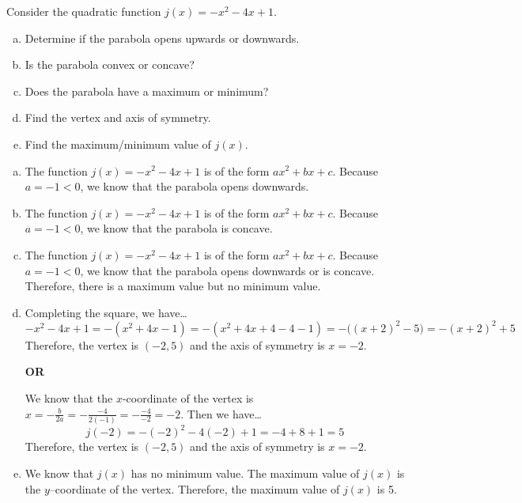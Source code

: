 \documentclass[11pt,letterpaper]{article}
\begin{document}
\newpage



 Consider the quadratic function $j(x)= -x^2 - 4x + 1$.
        \begin{enumerate}[(a)]
        \item Determine if the parabola opens upwards or downwards.
        \item Is the parabola convex or concave?
        \item Does the parabola have a maximum or minimum? 
        \item Find the vertex and axis of symmetry. 
        \item Find the maximum/minimum value of $j(x)$. 
        \end{enumerate} \pspace

\sol
\begin{enumerate}[(a)]
\item The function $j(x)= -x^2 - 4x + 1$ is of the form $ax^2 + bx + c$. Because $a= -1 < 0$, we know that the parabola opens downwards. \pspace

\item The function $j(x)= -x^2 - 4x + 1$ is of the form $ax^2 + bx + c$. Because $a= -1 < 0$, we know that the parabola is concave.\pspace

\item The function $j(x)= -x^2 - 4x + 1$ is of the form $ax^2 + bx + c$. Because $a= -1 < 0$, we know that the parabola opens downwards or is concave. Therefore, there is a maximum value but no minimum value. \pspace

\item Completing the square, we have\dots
	\[
	-x^2 - 4x + 1= -(x^2 + 4x - 1)= -(x^2 + 4x + 4 - 4 - 1)= -\big( (x + 2)^2 - 5 \big)= -(x + 2)^2 + 5
	\]
Therefore, the vertex is $(-2, 5)$ and the axis of symmetry is $x= -2$. 

\begin{center} {\bfseries OR} \end{center}

We know that the $x$-coordinate of the vertex is $x= -\frac{b}{2a}= -\frac{-4}{2(-1)}= -\frac{-4}{-2}= -2$. Then we have\dots
	\[
	j(-2)= -(-2)^2 - 4(-2) + 1= -4 + 8 + 1= 5
	\]
Therefore, the vertex is $(-2, 5)$ and the axis of symmetry is $x= -2$. \pspace

\item We know that $j(x)$ has no minimum value. The maximum value of $j(x)$ is the $y$--coordinate of the vertex. Therefore, the maximum value of $j(x)$ is 5. 
\end{enumerate}
\end{document}

